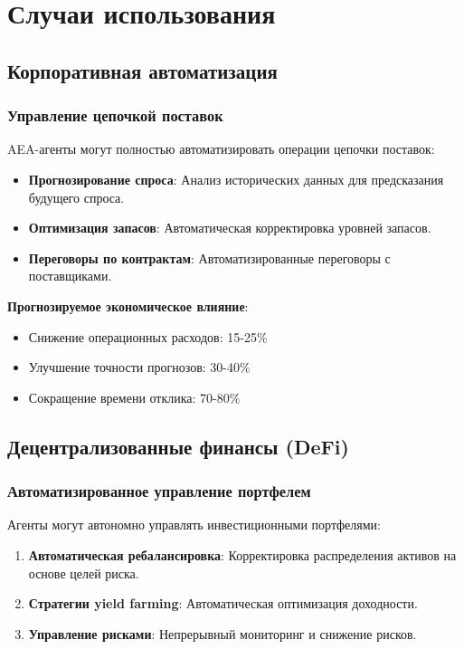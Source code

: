 \documentclass[12pt,a4paper]{article}
\begin{document}
\section{Случаи использования}

\subsection{Корпоративная автоматизация}

\subsubsection{Управление цепочкой поставок}

AEA-агенты могут полностью автоматизировать операции цепочки поставок:

\begin{itemize}
\item \textbf{Прогнозирование спроса}: Анализ исторических данных для предсказания будущего спроса.
\item \textbf{Оптимизация запасов}: Автоматическая корректировка уровней запасов.
\item \textbf{Переговоры по контрактам}: Автоматизированные переговоры с поставщиками.
\end{itemize}

\textbf{Прогнозируемое экономическое влияние}:
\begin{itemize}
\item Снижение операционных расходов: 15-25\%
\item Улучшение точности прогнозов: 30-40\%
\item Сокращение времени отклика: 70-80\%
\end{itemize}

\subsection{Децентрализованные финансы (DeFi)}

\subsubsection{Автоматизированное управление портфелем}

Агенты могут автономно управлять инвестиционными портфелями:

\begin{enumerate}
\item \textbf{Автоматическая ребалансировка}: Корректировка распределения активов на основе целей риска.
\item \textbf{Стратегии yield farming}: Автоматическая оптимизация доходности.
\item \textbf{Управление рисками}: Непрерывный мониторинг и снижение рисков.
\end{enumerate}
\end{document}
